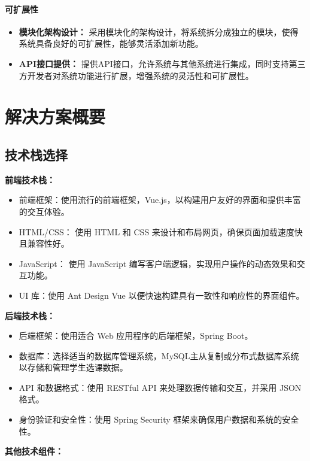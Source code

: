 \documentclass{article}
\begin{document}
\paragraph{可扩展性}
\begin{itemize}
	\item \textbf{模块化架构设计：}  采用模块化的架构设计，将系统拆分成独立的模块，使得系统具备良好的可扩展性，能够灵活添加新功能。
	\item \textbf{API接口提供：} 提供API接口，允许系统与其他系统进行集成，同时支持第三方开发者对系统功能进行扩展，增强系统的灵活性和可扩展性。
\end{itemize}

\section{解决方案概要}
\subsection{技术栈选择}
\textbf{前端技术栈：}

\begin{itemize}
    \item 前端框架：使用流行的前端框架，Vue.js，以构建用户友好的界面和提供丰富的交互体验。
    \item HTML/CSS： 使用 HTML 和 CSS 来设计和布局网页，确保页面加载速度快且兼容性好。
    \item JavaScript： 使用 JavaScript 编写客户端逻辑，实现用户操作的动态效果和交互功能。
    \item UI 库：使用 Ant Design Vue 以便快速构建具有一致性和响应性的界面组件。
\end{itemize}

\textbf{后端技术栈：}

\begin{itemize}
    \item 后端框架：使用适合 Web 应用程序的后端框架，Spring Boot。
    \item 数据库：选择适当的数据库管理系统，MySQL主从复制或分布式数据库系统 以存储和管理学生选课数据。
    \item API 和数据格式：使用 RESTful API 来处理数据传输和交互，并采用 JSON 格式。
    \item 身份验证和安全性：使用 Spring Security 框架来确保用户数据和系统的安全性。
\end{itemize}

\textbf{其他技术组件：}
\end{document}

